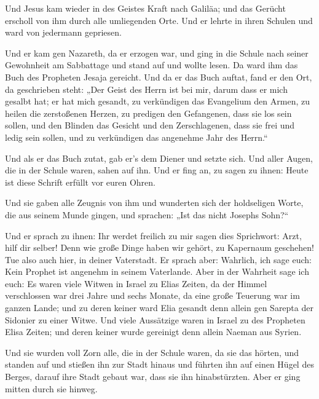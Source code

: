  Und Jesus kam wieder in des Geistes Kraft nach Galiläa;
und das Gerücht erscholl von ihm durch alle umliegenden Orte.
 Und er lehrte in ihren Schulen und ward von jedermann
gepriesen.

 Und er kam gen Nazareth, da er erzogen war, und ging in
die Schule nach seiner Gewohnheit am Sabbattage und stand auf und wollte
lesen.  Da ward ihm das Buch des Propheten Jesaja
gereicht. Und da er das Buch auftat, fand er den Ort, da geschrieben
steht:  „Der Geist des Herrn ist bei mir, darum dass er
mich gesalbt hat; er hat mich gesandt, zu verkündigen das Evangelium den
Armen, zu heilen die zerstoßenen Herzen, zu predigen den Gefangenen,
dass sie los sein sollen, und den Blinden das Gesicht und den
Zerschlagenen, dass sie frei und ledig sein sollen,  und
zu verkündigen das angenehme Jahr des Herrn.``

 Und als er das Buch zutat, gab er's dem Diener und
setzte sich. Und aller Augen, die in der Schule waren, sahen auf ihn.
 Und er fing an, zu sagen zu ihnen: Heute ist diese
Schrift erfüllt vor euren Ohren.

 Und sie gaben alle Zeugnis von ihm und wunderten sich
der holdseligen Worte, die aus seinem Munde gingen, und sprachen: „Ist
das nicht Josephs Sohn?{}``

 Und er sprach zu ihnen: Ihr werdet freilich zu mir sagen
dies Sprichwort: Arzt, hilf dir selber! Denn wie große Dinge haben wir
gehört, zu Kapernaum geschehen! Tue also auch hier, in deiner
Vaterstadt.  Er sprach aber: Wahrlich, ich sage euch:
Kein Prophet ist angenehm in seinem Vaterlande.  Aber in
der Wahrheit sage ich euch: Es waren viele Witwen in Israel zu Elias
Zeiten, da der Himmel verschlossen war drei Jahre und sechs Monate, da
eine große Teuerung war im ganzen Lande;  und zu deren
keiner ward Elia gesandt denn allein gen Sarepta der Sidonier zu einer
Witwe.  Und viele Aussätzige waren in Israel zu des
Propheten Elisa Zeiten; und deren keiner wurde gereinigt denn allein
Naeman aus Syrien.

 Und sie wurden voll Zorn alle, die in der Schule waren,
da sie das hörten,  und standen auf und stießen ihn zur
Stadt hinaus und führten ihn auf einen Hügel des Berges, darauf ihre
Stadt gebaut war, dass sie ihn hinabstürzten.  Aber er
ging mitten durch sie hinweg.

